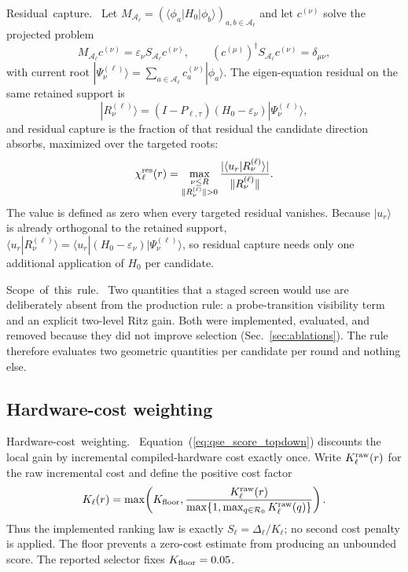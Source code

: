 \documentclass[
  reprint,
  amsmath,
  amssymb,
  aps,
  pra,
  nofootinbib,
  superscriptaddress,
  floatfix
]{revtex4-2}
\newcommand{\tentative}[1]{\textcolor{red!70!black}{#1}}
\newcommand{\structlabel}[1]{\noindent\mbox{\tentative{#1.}}~}
\newcommand{\Acal}{\mathcal{A}}
\newcommand{\ket}[1]{|#1\rangle}
\newcommand{\bra}[1]{\langle #1|}
\newcommand{\braket}[2]{\langle #1|#2\rangle}
\begin{document}
\structlabel{Residual capture}
Let $M_{\Acal_\ell}=(\bra{\phi_a}H_0\ket{\phi_b})_{a,b\in\Acal_\ell}$ and let $c^{(\nu)}$ solve the projected problem
\begin{equation}
M_{\Acal_\ell}c^{(\nu)}=\varepsilon_\nu S_{\Acal_\ell}c^{(\nu)},
\qquad
(c^{(\mu)})^\dagger S_{\Acal_\ell}c^{(\nu)}=\delta_{\mu\nu},
\label{eq:qse_phase3_gep}
\end{equation}
with current root $\ket{\Psi_\nu^{(\ell)}}=\sum_{a\in\Acal_\ell}c_a^{(\nu)}\ket{\phi_a}$.  The eigen-equation residual on the same retained support is
\begin{equation}
\ket{R_\nu^{(\ell)}}=(I-P_{\ell,\tau})(H_0-\varepsilon_\nu)\ket{\Psi_\nu^{(\ell)}},
\label{eq:qse_eigen_residual}
\end{equation}
and residual capture is the fraction of that residual the candidate direction absorbs, maximized over the targeted roots:
\begin{equation}
\chi_\ell^{\rm res}(r)
=
\max_{\substack{\nu\le R\\\|R_\nu^{(\ell)}\|>0}}
\frac{|\braket{u_r}{R_\nu^{(\ell)}}|}{\|R_\nu^{(\ell)}\|}.
\label{eq:qse_residual_capture}
\end{equation}
The value is defined as zero when every targeted residual vanishes.  Because $\ket{u_r}$ is already orthogonal to the retained support, $\braket{u_r}{R_\nu^{(\ell)}}=\bra{u_r}(H_0-\varepsilon_\nu)\ket{\Psi_\nu^{(\ell)}}$, so residual capture needs only one additional application of $H_0$ per candidate.

\structlabel{Scope of this rule}
Two quantities that a staged screen would use are deliberately absent from the production rule: a probe-transition visibility term and an explicit two-level Ritz gain.  Both were implemented, evaluated, and removed because they did not improve selection (Sec.~\ref{sec:ablations}).  The rule therefore evaluates two geometric quantities per candidate per round and nothing else.


\subsection{Hardware-cost weighting}
\label{sec:cost_weighting}

\structlabel{Hardware-cost weighting}
Equation~(\ref{eq:qse_score_topdown}) discounts the local gain by incremental
compiled-hardware cost exactly once.  Write $K_\ell^{\rm raw}(r)$ for the raw
incremental cost and define the positive cost factor
\begin{equation}
K_\ell(r)
=
\max\!\left(
K_{\rm floor},
\frac{K_\ell^{\rm raw}(r)}
{\max\!\left\{1,\max_{q\in\mathcal R_0}K_\ell^{\rm raw}(q)\right\}}
\right).
\label{eq:qse_cost_normalization}
\end{equation}
Thus the implemented ranking law is exactly $S_\ell=\Delta_\ell/K_\ell$;
no second cost penalty is applied.  The floor prevents a zero-cost estimate
from producing an unbounded score.  The reported selector fixes
$K_{\rm floor}=0.05$.
\end{document}

